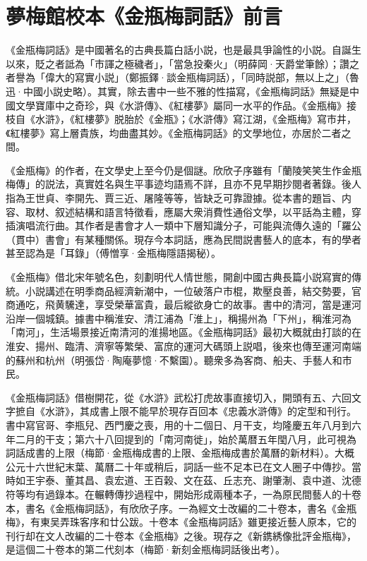 \chapter*{夢梅館校本《金瓶梅詞話》前言}
\thispagestyle{empty}

《金瓶梅詞話》是中國著名的古典長篇白話小説，也是最具爭論性的小説。自誕生以來，貶之者詆為「市諢之極穢者」，「當急投秦火」{\innerzhushi（明薛岡·天爵堂筆餘）}；讚之者譽為「偉大的寫實小説」{\innerzhushi（鄭振鐸·談金瓶梅詞話）}，「同時説部，無以上之」{\innerzhushi（魯迅·中國小説史略）}。其實，除去書中一些不雅的性描寫，《金瓶梅詞話》無疑是中國文學寶庫中之奇珍，與《水滸傳》、《紅樓夢》屬同一水平的作品。《金瓶梅》接枝自《水滸》，《紅樓夢》脱胎於《金瓶》；《水滸傳》寫江湖，《金瓶梅》寫市井，《紅樓夢》寫上層貴族，均曲盡其妙。《金瓶梅詞話》的文學地位，亦居於二者之間。

《金瓶梅》的作者，在文學史上至今仍是個謎。欣欣子序雖有「蘭陵笑笑生作金瓶梅傳」的説法，真實姓名與生平事迹均語焉不詳，且亦不見早期抄閱者著錄。後人指為王世貞、李開先、賈三近、屠隆等等，皆缺乏可靠證據。從本書的題旨、内容、取材、叙述結構和語言特徵看，應屬大衆消費性通俗文學，以平話為主體，穿插演唱流行曲。其作者是書會才人一類中下層知識分子，可能與流傳久遠的「羅公（貫中）書會」有某種關係。現存今本詞話，應為民間説書藝人的底本，有的學者甚至認為是「耳錄」{\innerzhushi（傅憎享·金瓶梅隱語揭秘）}。

《金瓶梅》借北宋年號名色，刻劃明代人情世態，開創中國古典長篇小説寫實的傳統。小説講述在明季商品經濟新潮中，一位破落户市棍，欺壓良善，結交勢要，官商通吃，飛黄驣達，享受榮華富貴，最后縱欲身亡的故事。書中的清河，當是運河沿岸一個城鎮。據書中稱淮安、清江浦為「淮上」，稱揚州為「下州」，稱淮河為「南河」，生活場景接近南清河的淮揚地區。《金瓶梅詞話》最初大概就由打談的在淮安、揚州、臨清、濟寧等繁榮、富庶的運河大碼頭上説唱，後來也傳至運河南端的蘇州和杭州{\innerzhushi（明張岱·陶庵夢憶·不繫園）}。聽衆多為客商、船夫、手藝人和市民。

《金瓶梅詞話》借樹開花，從《水滸》武松打虎故事直接切入，開頭有五、六回文字摭自《水滸》，其成書上限不能早於現存百回本《忠義水滸傳》的定型和刊行。書中寫官哥、李瓶兒、西門慶之喪，用的十二個日、月干支，均隆慶五年八月到六年二月的干支；第六十八回提到的「南河南徙」，始於萬暦五年閠八月，此可視為詞話成書的上限{\innerzhushi（梅節·金瓶梅成書的上限、金瓶梅成書於萬曆的新材料）}。大概公元十六世紀末葉、萬曆二十年或稍后，詞話一些不足本已在文人圈子中傳抄。當時如王宇泰、董其昌、袁宏道、王百榖、文在茲、丘志充、謝肇淛、袁中道、沈德符等均有過錄本。在輾轉傳抄過程中，開始形成兩種本子，一為原民間藝人的十卷本，書名《金瓶梅詞話》，有欣欣子序。一為經文士改編的二十卷本，書名《金瓶梅》，有東吴弄珠客序和廿公跋。十卷本《金瓶梅詞話》雖更接近藝人原本，它的刊行却在文人改編的二十卷本《金瓶梅》之後。現存之《新鎸綉像批評金瓶梅》，是這個二十卷本的第二代刻本{\innerzhushi（梅節·新刻金瓶梅詞話後出考）}。


